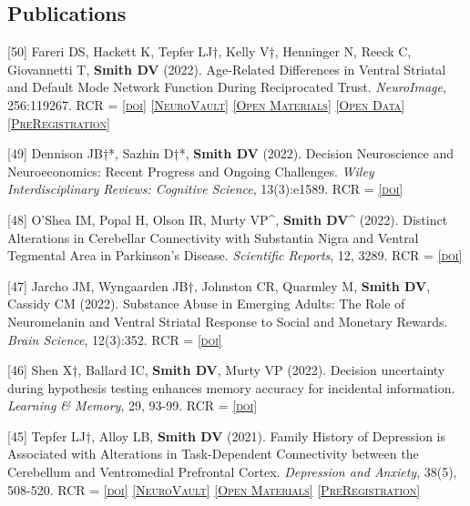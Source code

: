 \documentclass[11pt, letterpaper]{article}
\newcommand{\doi}[1]{\href{#1}{\scriptsize\textsc{[doi]}}} %
\newcommand{\neurovault}[1]{\href{#1}{\scriptsize\textsc{[NeuroVault]}}}
\newcommand{\materials}[1]{\href{#1}{\scriptsize\textsc{[Open Materials]}}}
\newcommand{\data}[1]{\href{#1}{\scriptsize\textsc{[Open Data]}}}
\newcommand{\preregistration}[1]{\href{#1}{\scriptsize\textsc{[PreRegistration]}}}
\begin{document}
\subsection*{Publications}

\begin{hangparas}{.5in}{1}

[50] Fareri DS, Hackett K, Tepfer LJ†, Kelly V†, Henninger N, Reeck C, Giovannetti T, \textbf{Smith DV}  (2022). Age-Related Differences in Ventral Striatal and Default Mode Network Function During Reciprocated Trust. \textit{NeuroImage}, 256:119267. RCR =  \doi{https://doi.org/10.1016/j.neuroimage.2022.119267} \neurovault{https://identifiers.org/neurovault.collection:10447} \materials{https://github.com/DVS-Lab/srndna-trustgame} \data{https://openneuro.org/datasets/ds003745} \preregistration{https://aspredicted.org/MVZ_ODI}

[49] Dennison JB†*, Sazhin D†*, \textbf{Smith DV} (2022). Decision Neuroscience and Neuroeconomics: Recent Progress and Ongoing Challenges. \textit{Wiley Interdisciplinary Reviews: Cognitive Science}, 13(3):e1589. RCR =  \doi{https://doi.org/10.1002/wcs.1589}

[48] O'Shea IM, Popal H, Olson IR, Murty VP\^{}, \textbf{Smith DV}\^{} (2022). Distinct Alterations in Cerebellar Connectivity with Substantia Nigra and Ventral Tegmental Area in Parkinson's Disease. \textit{Scientific Reports}, 12, 3289. RCR =  \doi{https://doi.org/10.1038/s41598-022-07020-x}

[47] Jarcho JM, Wyngaarden JB†, Johnston CR, Quarmley M, \textbf{Smith DV}, Cassidy CM (2022). Substance Abuse in Emerging Adults: The Role of Neuromelanin and Ventral Striatal Response to Social and Monetary Rewards. \textit{Brain Science}, 12(3):352. RCR =  \doi{https://doi.org/10.3390/brainsci12030352}

[46] Shen X†, Ballard IC, \textbf{Smith DV}, Murty VP (2022). Decision uncertainty during hypothesis testing enhances memory accuracy for incidental information. \textit{Learning \& Memory}, 29, 93-99. RCR =  \doi{https://doi.org/10.1101/lm.053458.121}

[45] Tepfer LJ†, Alloy LB, \textbf{Smith DV} (2021). Family History of Depression is Associated with Alterations in Task-Dependent Connectivity between the Cerebellum and Ventromedial Prefrontal Cortex. \textit{Depression and Anxiety},  38(5), 508-520. RCR =  \doi{https://doi.org/10.1002/da.23143} \neurovault{https://neurovault.org/collections/6130/} \materials{https://osf.io/ju32v/} \preregistration{http://aspredicted.org/blind.php?x=8qw2h3}


\end{hangparas}
\end{document}
